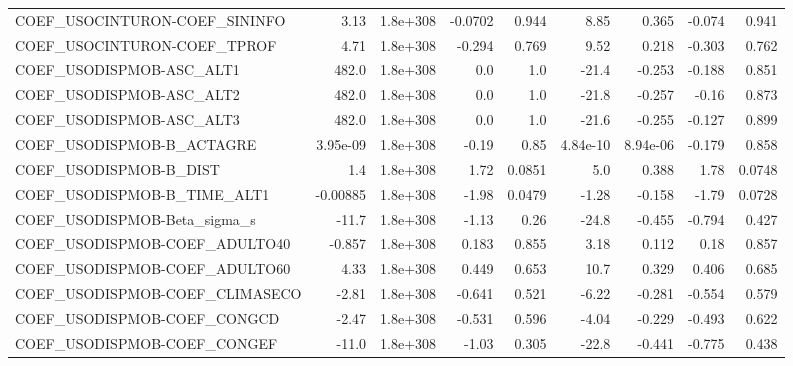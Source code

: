 \begin{tabular}{lrrrrrrrr}
COEF\_USOCINTURON-COEF\_SININFO     &        3.13 &     1.8e+308 & -0.0702 &    0.944 &       8.85 &       0.365 &       -0.074 &         0.941 \\
COEF\_USOCINTURON-COEF\_TPROF       &        4.71 &     1.8e+308 &  -0.294 &    0.769 &       9.52 &       0.218 &       -0.303 &         0.762 \\
COEF\_USODISPMOB-ASC\_ALT1          &       482.0 &     1.8e+308 &     0.0 &      1.0 &      -21.4 &      -0.253 &       -0.188 &         0.851 \\
COEF\_USODISPMOB-ASC\_ALT2          &       482.0 &     1.8e+308 &     0.0 &      1.0 &      -21.8 &      -0.257 &        -0.16 &         0.873 \\
COEF\_USODISPMOB-ASC\_ALT3          &       482.0 &     1.8e+308 &     0.0 &      1.0 &      -21.6 &      -0.255 &       -0.127 &         0.899 \\
COEF\_USODISPMOB-B\_ACTAGRE         &    3.95e-09 &     1.8e+308 &   -0.19 &     0.85 &   4.84e-10 &    8.94e-06 &       -0.179 &         0.858 \\
COEF\_USODISPMOB-B\_DIST            &         1.4 &     1.8e+308 &    1.72 &   0.0851 &        5.0 &       0.388 &         1.78 &        0.0748 \\
COEF\_USODISPMOB-B\_TIME\_ALT1       &    -0.00885 &     1.8e+308 &   -1.98 &   0.0479 &      -1.28 &      -0.158 &        -1.79 &        0.0728 \\
COEF\_USODISPMOB-Beta\_sigma\_s      &       -11.7 &     1.8e+308 &   -1.13 &     0.26 &      -24.8 &      -0.455 &       -0.794 &         0.427 \\
COEF\_USODISPMOB-COEF\_ADULTO40     &      -0.857 &     1.8e+308 &   0.183 &    0.855 &       3.18 &       0.112 &         0.18 &         0.857 \\
COEF\_USODISPMOB-COEF\_ADULTO60     &        4.33 &     1.8e+308 &   0.449 &    0.653 &       10.7 &       0.329 &        0.406 &         0.685 \\
COEF\_USODISPMOB-COEF\_CLIMASECO    &       -2.81 &     1.8e+308 &  -0.641 &    0.521 &      -6.22 &      -0.281 &       -0.554 &         0.579 \\
COEF\_USODISPMOB-COEF\_CONGCD       &       -2.47 &     1.8e+308 &  -0.531 &    0.596 &      -4.04 &      -0.229 &       -0.493 &         0.622 \\
COEF\_USODISPMOB-COEF\_CONGEF       &       -11.0 &     1.8e+308 &   -1.03 &    0.305 &      -22.8 &      -0.441 &       -0.775 &         0.438 \\

\end{tabular}
